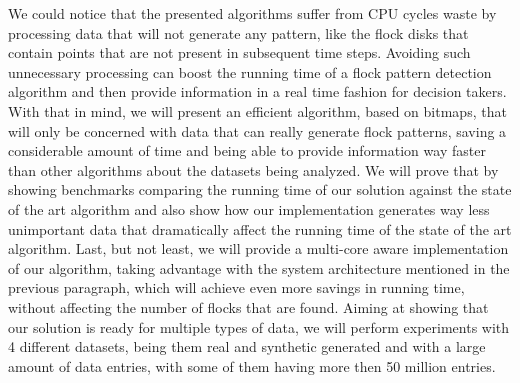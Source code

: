 We could notice that the presented algorithms suffer from CPU cycles waste by processing data that will not generate any
pattern, like the flock disks that contain points that are not present in subsequent time steps. Avoiding such
unnecessary processing can boost the running time of a flock pattern detection algorithm and then provide information in
a real time fashion for decision takers. With that in mind, we will present an efficient algorithm, based on bitmaps,
that will only be concerned with data that can really generate flock patterns, saving a considerable amount of time and
being able to provide information way faster than other algorithms about the datasets being analyzed. We will prove that
by showing benchmarks comparing the running time of our solution against the state of the art algorithm and also show
how our implementation generates way less unimportant data that dramatically affect the running time of the state of the
art algorithm. Last, but not least, we will provide a multi-core aware implementation of our algorithm, taking advantage
with the system architecture mentioned in the previous paragraph, which will achieve even more savings in running time,
without affecting the number of flocks that are found. Aiming at showing that our solution is ready for multiple types
of data, we will perform experiments with 4 different datasets, being them real and synthetic generated and with a large
amount of data entries, with some of them having more then 50 million entries.
